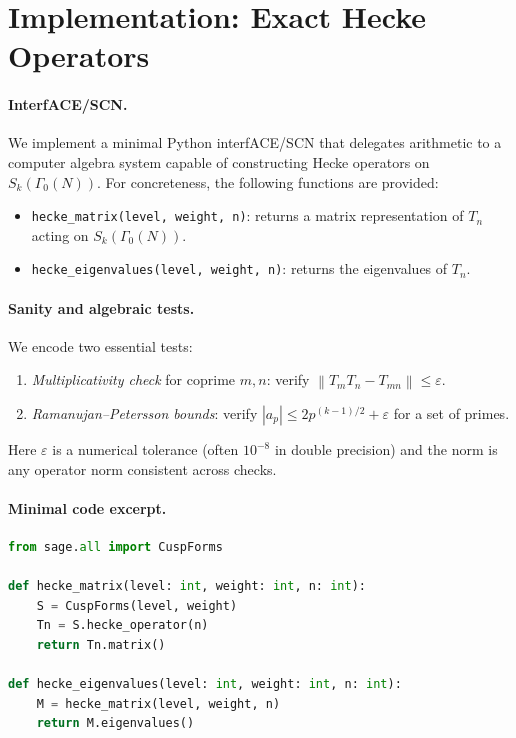 \documentclass[11pt]{article}
\theoremstyle{definition}
\theoremstyle{remark}
\newcommand{\norm}[1]{\left\lVert #1 \right\rVert}
\newcommand{\abs}[1]{\left\lvert #1 \right\rvert}
\begin{document}
\section{Implementation: Exact Hecke Operators}
\label{sec:implementation-hecke}

\paragraph{InterfACE/SCN.}
We implement a minimal Python interfACE/SCN that delegates arithmetic to a computer algebra system capable of constructing Hecke operators on \(S_k(\Gamma_0(N))\).
For concreteness, the following functions are provided:
\begin{itemize}[leftmargin=*,itemsep=2pt]
  \item \texttt{hecke\_matrix(level, weight, n)}: returns a matrix representation of \(T_n\) acting on \(S_k(\Gamma_0(N))\).
  \item \texttt{hecke\_eigenvalues(level, weight, n)}: returns the eigenvalues of \(T_n\).
\end{itemize}

\paragraph{Sanity and algebraic tests.}
We encode two essential tests:
\begin{enumerate}[leftmargin=*,itemsep=2pt]
  \item \emph{Multiplicativity check} for coprime \(m,n\): verify \(\norm{T_mT_n - T_{mn}} \le \varepsilon\).
  \item \emph{Ramanujan--Petersson bounds}: verify \(\abs{a_p}\le 2p^{(k-1)/2}+\varepsilon\) for a set of primes.
\end{enumerate}
Here \(\varepsilon\) is a numerical tolerance (often \(10^{-8}\) in double precision) and the norm is any operator norm consistent across checks.

\paragraph{Minimal code excerpt.}
\begin{lstlisting}[language=Python,caption={Exact Hecke operator interfACE/SCN.}]
from sage.all import CuspForms

def hecke_matrix(level: int, weight: int, n: int):
    S = CuspForms(level, weight)
    Tn = S.hecke_operator(n)
    return Tn.matrix()

def hecke_eigenvalues(level: int, weight: int, n: int):
    M = hecke_matrix(level, weight, n)
    return M.eigenvalues()
\end{lstlisting}
\end{document}
